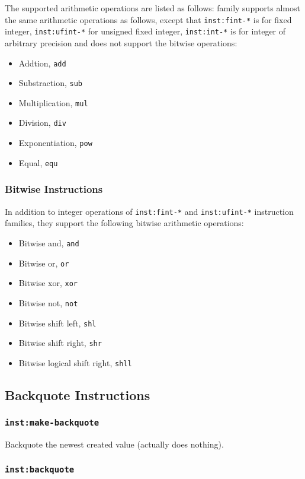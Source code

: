 \documentclass{article}
\newcommand{\inst}[1] {\texttt{inst:#1}}
\begin{document}
The supported arithmetic operations are listed as follows:
family supports almost the same arithmetic operations as follows, except that \inst{fint-*} is for fixed integer, \inst{ufint-*} for unsigned fixed integer, \inst{int-*} is for integer of arbitrary precision and does not support the bitwise operations:
\begin{itemize}
\item Addtion, \texttt{add}
\item Substraction, \texttt{sub}
\item Multiplication, \texttt{mul}
\item Division, \texttt{div}
\item Exponentiation, \texttt{pow}
\item Equal, \texttt{equ}
\end{itemize}

\subsubsection{Bitwise Instructions}

In addition to integer operations of \inst{fint-*} and \inst{ufint-*} instruction families, they support the following bitwise arithmetic operations:
\begin{itemize}
\item Bitwise and, \texttt{and}
\item Bitwise or, \texttt{or}
\item Bitwise xor, \texttt{xor}
\item Bitwise not, \texttt{not}
\item Bitwise shift left, \texttt{shl}
\item Bitwise shift right, \texttt{shr}
\item Bitwise logical shift right, \texttt{shll}
\end{itemize}

\subsection{Backquote Instructions}

\subsubsection{\inst{make-backquote}}

Backquote the newest created value (actually does nothing).

\subsubsection{\inst{backquote}}
\end{document}
